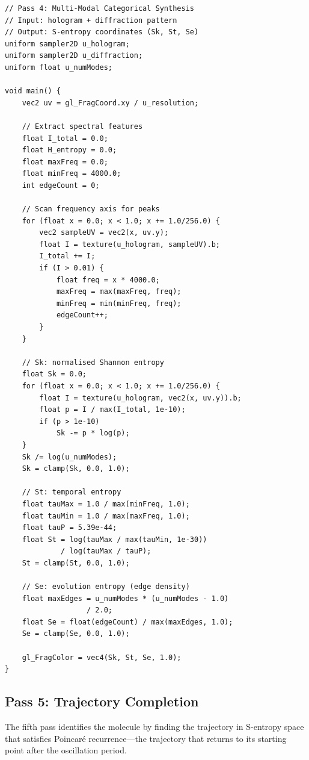 \documentclass[11pt,twocolumn,a4paper]{article}
\theoremstyle{definition}
\theoremstyle{remark}
\begin{document}
\begin{lstlisting}[style=glsl, caption={Pass 4: Categorical synthesis shader}, label={lst:pass4}]
// Pass 4: Multi-Modal Categorical Synthesis
// Input: hologram + diffraction pattern
// Output: S-entropy coordinates (Sk, St, Se)
uniform sampler2D u_hologram;
uniform sampler2D u_diffraction;
uniform float u_numModes;

void main() {
    vec2 uv = gl_FragCoord.xy / u_resolution;

    // Extract spectral features
    float I_total = 0.0;
    float H_entropy = 0.0;
    float maxFreq = 0.0;
    float minFreq = 4000.0;
    int edgeCount = 0;

    // Scan frequency axis for peaks
    for (float x = 0.0; x < 1.0; x += 1.0/256.0) {
        vec2 sampleUV = vec2(x, uv.y);
        float I = texture(u_hologram, sampleUV).b;
        I_total += I;
        if (I > 0.01) {
            float freq = x * 4000.0;
            maxFreq = max(maxFreq, freq);
            minFreq = min(minFreq, freq);
            edgeCount++;
        }
    }

    // Sk: normalised Shannon entropy
    float Sk = 0.0;
    for (float x = 0.0; x < 1.0; x += 1.0/256.0) {
        float I = texture(u_hologram, vec2(x, uv.y)).b;
        float p = I / max(I_total, 1e-10);
        if (p > 1e-10)
            Sk -= p * log(p);
    }
    Sk /= log(u_numModes);
    Sk = clamp(Sk, 0.0, 1.0);

    // St: temporal entropy
    float tauMax = 1.0 / max(minFreq, 1.0);
    float tauMin = 1.0 / max(maxFreq, 1.0);
    float tauP = 5.39e-44;
    float St = log(tauMax / max(tauMin, 1e-30))
             / log(tauMax / tauP);
    St = clamp(St, 0.0, 1.0);

    // Se: evolution entropy (edge density)
    float maxEdges = u_numModes * (u_numModes - 1.0)
                   / 2.0;
    float Se = float(edgeCount) / max(maxEdges, 1.0);
    Se = clamp(Se, 0.0, 1.0);

    gl_FragColor = vec4(Sk, St, Se, 1.0);
}
\end{lstlisting}

\subsection{Pass 5: Trajectory Completion}

The fifth pass identifies the molecule by finding the trajectory in S-entropy space that satisfies Poincar{\'e} recurrence---the trajectory that returns to its starting point after the oscillation period.
\end{document}

